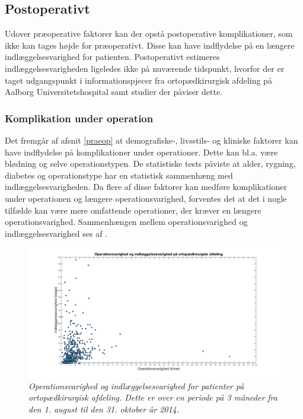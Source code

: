 \subsection{Postoperativt}
Udover præoperative faktorer kan der opstå postoperative komplikationer, som ikke kan tages højde for præoperativt. Disse kan have indflydelse på en længere indlæggelsesvarighed for patienten. Postoperativt estimeres indlæggelsesvarigheden ligeledes ikke på nuværende tidspunkt, hvorfor der er taget udgangspunkt i informationspjecer fra ortopædkirurgisk afdeling på Aalborg Universitetshospital samt studier der påviser dette.

\subsubsection{Komplikation under operation}
Det fremgår af afsnit \ref{praeop} at demografiske-, livsstils- og kliniske faktorer kan have indflydelse på komplikationer under operationer. Dette kan bl.a. være blødning og selve operationstypen. De statistiske tests påviste at alder, rygning, diabetes og operationstype har en statistisk sammenhæng med indlæggelsesvarigheden. Da flere af disse faktorer kan medføre komplikationer under operationen og længere operationsvarighed, forventes det at det i nogle tilfælde kan være mere omfattende operationer, der kræver en længere operationsvarighed. Sammenhængen mellem operationsvarighed og indlæggelsesvarighed ses af .


\begin{figure}[H]
	\centering
	\includegraphics[scale=0.35]{figures/opindlaeg.png}
	\caption{\textit{Operationsvarighed og indlæggelsesvarighed for patienter på ortopædkirurgisk afdeling. Dette er over en periode på 3 måneder fra den 1. august til den 31. oktober år 2014.}}
	\label{opindlaeg}
	\end{figure}

